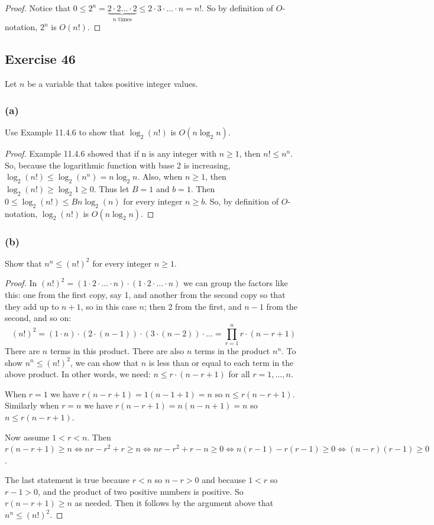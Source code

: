 \documentclass[14pt]{extarticle}
\begin{document}
\begin{proof}
Notice that \(0 \leq 2^n = \underbrace{2 \cdot 2 \ldots \cdot 2}_{n \text{ times}} \leq 2\cdot 3\cdot \ldots \cdot n = n!\).
So by definition of \(O\)-notation, \(2^n\) is \(O(n!)\).
\end{proof}

\subsection{Exercise 46}
Let \(n\) be a variable that takes positive integer values.

\subsubsection{(a)}
Use Example 11.4.6 to show that \(\log_2(n!)\) is \(O(n\log_2 n)\).

\begin{proof}
Example 11.4.6 showed that if n is any integer with \(n \geq 1\), then \(n! \leq n^n\). So, because the logarithmic 
function with base 2 is increasing, \(\log_2(n!) \leq \log_2(n^n) = n \log_2 n\). Also, when \(n \geq 1\), then 
\(\log_2(n!) \geq \log_2 1 \geq 0\). Thus let \(B = 1\) and \(b = 1\). Then \(0 \leq \log_2(n!) \leq B n \log_2 (n)\) for 
every integer \(n \geq b\). So, by definition of \(O\)-notation, \(\log_2(n!)\) is \(O(n \log_2 n)\).
\end{proof}

\subsubsection{(b)}
Show that \(n^n \leq (n!)^2\) for every integer \(n \geq 1\).
\begin{proof}
In \((n!)^2 = (1 \cdot 2 \cdot \ldots \cdot n) \cdot (1 \cdot 2 \cdot \ldots \cdot n)\) we can group the factors like this:
one from the first copy, say 1, and another from the second copy so that they add up to \(n+1\), so in this case \(n\);
then 2 from the first, and \(n-1\) from the second, and so on:
\[
(n!)^2 = (1 \cdot n) \cdot (2 \cdot (n-1)) \cdot (3 \cdot (n-2)) \cdot \ldots = \prod_{r = 1}^n r \cdot (n-r+1)
\]
There are \(n\) terms in this product. There are also \(n\) terms in the product \(n^n\). To show \(n^n \leq (n!)^2\), we
can show that \(n\) is less than or equal to each term in the above product. In other words, we need: \(n \leq r \cdot 
(n-r+1)\) for all \(r = 1, \ldots, n\).

When \(r = 1\) we have \(r(n-r+1) = 1(n-1+1) = n\) so \(n \leq r(n-r+1)\). Similarly when \(r=n\) we have 
\(r(n-r+1) = n(n-n+1) = n\) so \(n \leq r(n-r+1)\).

Now assume \(1 < r < n\). Then \(r(n-r+1) \geq n \iff nr - r^2 + r \geq n \iff nr - r^2 + r - n \geq 0 \iff n(r-1) -r(r-1) 
\geq 0 \iff (n-r)(r-1) \geq 0\). 

The last statement is true because \(r < n\) so \(n - r > 0\) and because \(1 < r\) so \(r - 1 > 0\), and the product of two 
positive numbers is positive. So \(r(n-r+1) \geq n\) as needed. Then it follows by the argument above that 
\(n^n \leq (n!)^2\).
\end{proof}
\end{document}
